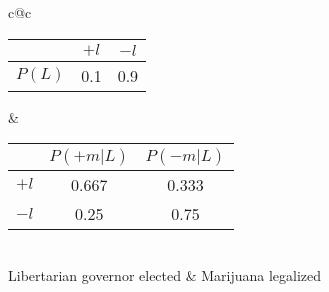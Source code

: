 \documentclass[12pt]{article}
\begin{document}
\begin{center}
\begin{tabular}{c@{\hspace*{0.5in}}c}
\begin{tabular}{|c|c|c|} \hline
       & $+l$  & $-l$ \\ \hline
$P(L)$ & 0.1   & 0.9  \\ \hline
\end{tabular} &
\begin{tabular}{|c|c|c|} \hline
     & $P(+m | L)$ & $P(-m | L)$ \\ \hline
$+l$ & 0.667       & 0.333     \\ \hline
$-l$ & 0.25        & 0.75      \\ \hline
\end{tabular} \\
Libertarian governor elected & Marijuana legalized
\end{tabular}
\end{center}
\end{document}
